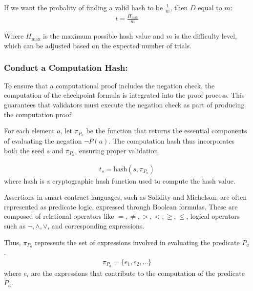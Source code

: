\documentclass[runningheads]{llncs}
\begin{document}
If we want the probality of finding a valid hash to be $\frac{1}{m}$, then \( D \) equal to \( m \):
\begin{gather}
\label{eq:13}
t = \frac{H_{\text{max}}}{m}
\end{gather}

Where \( H_{\text{max}} \) is the maximum possible hash value and \( m \) is the difficulty level, which can be adjusted based on the expected number of trials.
\subsubsection{Conduct a Computation Hash:} To ensure that a computational proof includes the negation check, the computation of the checkpoint formula is integrated into the proof process. This guarantees that validators must execute the negation check as part of producing the computation proof.

For each element \( a \), let \(\pi_{P_{a}}\) be the function that returns the essential components of evaluating the negation \(\neg P(a)\). The computation hash thus incorporates both the seed \( s \) and \(\pi_{P_{a}}\), ensuring proper validation.

\begin{gather}
\label{eq:14}
t_s = \text{hash}(s, \pi_{P_{a}})
\end{gather}
where \(\text{hash}\) is a cryptographic hash function used to compute the hash value.

Assertions in smart contract languages, such as Solidity and Michelson, are often represented as predicate logic, expressed through Boolean formulas. These are composed of relational operators like \( =, \neq, >, <, \geq, \leq \), logical operators such as \( \neg, \land, \lor\), and corresponding expressions.

Thus, \(\pi_{P_{a}}\) represents the set of expressions involved in evaluating the predicate \(P_a\).
\begin{gather*}
\pi_{P_{a}} = \{ e_1, e_2, \ldots \}
\end{gather*}
where \(e_i\) are the expressions that contribute to the computation of the predicate \(P_a\).



\end{document}
